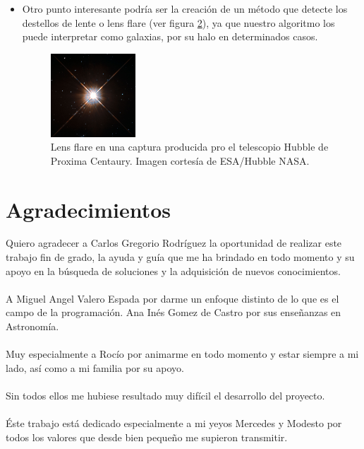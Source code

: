 \begin{itemize}
\begin{figure}[!htb]
					\caption{\label{fig:EsquemaHubble}{\small Secuencia del doctor Hubble para la clasificación de galaxias.}}
				\end{figure}
	\item Otro punto interesante podría ser la creación de un método que detecte los destellos de lente o lens flare (ver figura \ref{fig:lensflare}), ya que nuestro algoritmo los puede interpretar como galaxias, por su halo en determinados casos.
			\begin{figure}[!htb]
				\centering
				\includegraphics[width=0.3\textwidth]{images/HubbleProximaCentauri_LENSFLARE}
				\caption{\label{fig:lensflare}Lens flare en una captura producida pro el telescopio Hubble de Proxima Centaury. Imagen cortesía de  ESA/Hubble NASA.}
			\end{figure}
	\end{itemize} 
	
	\newpage
	\section{Agradecimientos}
	
	Quiero agradecer a Carlos Gregorio Rodríguez la oportunidad de realizar este trabajo fin de grado, la ayuda y guía que me ha brindado en todo momento y su apoyo en la búsqueda de soluciones y la adquisición de nuevos conocimientos.\\ 
	\\ A Miguel Angel Valero Espada por darme un enfoque distinto de lo que es el campo de la programación. Ana Inés Gomez de Castro por sus enseñanzas en Astronomía.\\
	\\ Muy especialmente a Rocío por animarme en todo momento y estar siempre a mi lado, así como a mi familia por su apoyo.\\
	\\ Sin todos ellos me hubiese resultado muy difícil el desarrollo del proyecto.
	\\
	\\Éste trabajo está dedicado especialmente a mi yeyos Mercedes y Modesto por todos los valores que desde bien pequeño me supieron transmitir.
	\newpage

